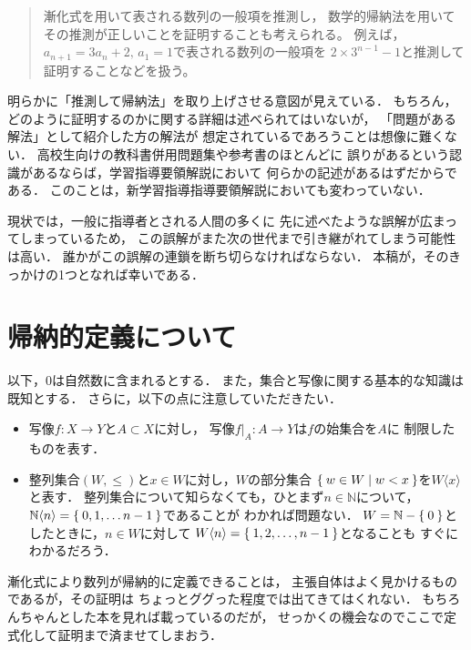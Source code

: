 \documentclass[11pt,a4paper]{ltjsarticle} %
\theoremstyle{mystyle} %
\begin{document}
\begin{quote}
  漸化式を用いて表される数列の一般項を推測し，
  数学的帰納法を用いてその推測が正しいことを証明することも考えられる。
  例えば，$a_{n+1} = 3 a_n + 2 , \, a_1=1$で表される数列の一般項を
  $2 \times 3^{n-1} -1 $と推測して証明することなどを扱う。
\end{quote}

明らかに「推測して帰納法」を取り上げさせる意図が見えている．
もちろん，どのように証明するのかに関する詳細は述べられてはいないが，
「問題がある解法」として紹介した方の解法が
想定されているであろうことは想像に難くない．
高校生向けの教科書併用問題集や参考書のほとんどに
誤りがあるという認識があるならば，学習指導要領解説において
何らかの記述があるはずだからである．
このことは，新学習指導指導要領解説においても変わっていない．


現状では，一般に指導者とされる人間の多くに
先に述べたような誤解が広まってしまっているため，
この誤解がまた次の世代まで引き継がれてしまう可能性は高い．
誰かがこの誤解の連鎖を断ち切らなければならない．
本稿が，そのきっかけの1つとなれば幸いである．




\section{帰納的定義について}


以下，$0$は自然数に含まれるとする．
また，集合と写像に関する基本的な知識は既知とする．
さらに，以下の点に注意していただきたい．
\begin{itemize}
  \item 写像$f \colon X \longrightarrow Y$と$A \subset X$に対し，
    写像$f|_A \colon A \longrightarrow Y$は$f$の始集合を$A$に
    制限したものを表す．
  \item 整列集合$(W, \leq)$と$x \in W$に対し，$W$の部分集合
    $\Set{ w \in W \mid w < x}$を$W \langle x \rangle$と表す．
    整列集合について知らなくても，ひとまず$n \in \mathbb{N}$について，
    $\mathbb{N} \langle n \rangle = \Set{ 0,1, \ldots n-1}$であることが
    わかれば問題ない．
    $W = \mathbb{N} - \Set{0}$としたときに，$n \in W$に対して
    $W \langle n \rangle = \Set{1,2, \ldots, n-1}$となることも
    すぐにわかるだろう．
\end{itemize}


漸化式により数列が帰納的に定義できることは，
主張自体はよく見かけるものであるが，その証明は
ちょっとググった程度では出てきてはくれない．
もちろんちゃんとした本を見れば載っているのだが，
せっかくの機会なのでここで定式化して証明まで済ませてしまおう．
\end{document}
